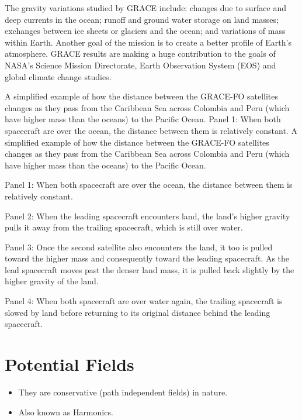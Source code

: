 \documentclass[a4paper,12pt]{article}
\begin{document}
The gravity variations studied by GRACE include: changes due to surface and deep currents in the ocean; runoff and ground water storage on land masses; exchanges between ice sheets or glaciers and the ocean; and variations of mass within Earth. Another goal of the mission is to create a better profile of Earth's atmosphere. GRACE results are making a huge contribution to the goals of NASA's Science Mission Directorate, Earth Observation System (EOS) and global climate change studies.
\newpage


A simplified example of how the distance between the GRACE-FO satellites changes as they pass from the Caribbean Sea across Colombia and Peru (which have higher mass than the oceans) to the Pacific Ocean. Panel 1: When both spacecraft are over the ocean, the distance between them is relatively constant. 
A simplified example of how the distance between the GRACE-FO satellites changes as they pass from the Caribbean Sea across Colombia and Peru (which have higher mass than the oceans) to the Pacific Ocean.

Panel 1: When both spacecraft are over the ocean, the distance between them is relatively constant.

Panel 2: When the leading spacecraft encounters land, the land's higher gravity pulls it away from the trailing spacecraft, which is still over water.

Panel 3: Once the second satellite also encounters the land, it too is pulled toward the higher mass and consequently toward the leading spacecraft. As the lead spacecraft moves past the denser land mass, it is pulled back slightly by the higher gravity of the land.

Panel 4: When both spacecraft are over water again, the trailing spacecraft is slowed by land before returning to its original distance behind the leading spacecraft.





\newpage

\section{Potential Fields}
\begin{itemize}
\item They are conservative (path independent fields) in nature.     
\item Also known as Harmonics.
\end{itemize}
\end{document}
